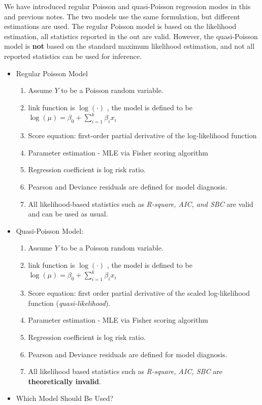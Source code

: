 \documentclass[
]{book}
\providecommand{\tightlist}{%
  \setlength{\itemsep}{0pt}\setlength{\parskip}{0pt}}
\begin{document}
We have introduced regular Poisson and quasi-Poisson regression modes in this and previous notes. The two models use the same formulation, but different estimations are used. The regular Poisson model is based on the likelihood estimation, all statistics reported in the out are valid. However, the quasi-Poisson model is \textbf{not} based on the standard maximum likelihood estimation, and not all reported statistics can be used for inference.

\begin{itemize}
\tightlist
\item
  Regular Poisson Model

  \begin{enumerate}
  \def\labelenumi{\arabic{enumi}.}
  \tightlist
  \item
    Assume \(Y\) to be a Poisson random variable.
  \item
    link function is \(\log(\cdot)\) , the model is defined to be \(\log(\mu) =\beta_0 + \sum_{i=1}^k \beta_ix_i\)
  \item
    Score equation: first-order partial derivative of the log-likelihood function
  \item
    Parameter estimation - MLE via Fisher scoring algorithm
  \item
    Regression coefficient is log risk ratio.
  \item
    Pearson and Deviance residuals are defined for model diagnosis.
  \item
    All likelihood-based statistics such as \emph{R-square, AIC, and SBC} are valid and can be used as usual.
  \end{enumerate}
\item
  Quasi-Poisson Model:

  \begin{enumerate}
  \def\labelenumi{\arabic{enumi}.}
  \tightlist
  \item
    Assume \(Y\) to be a Poisson random variable.
  \item
    link function is \(\log(\cdot)\) , the model is defined to be \(\log(\mu) =\beta_0 + \sum_{i=1}^k \beta_ix_i\)
  \item
    Score equation: first order partial derivative of the scaled log-likelihood function (\emph{quasi-likelihood}).
  \item
    Parameter estimation - MLE via Fisher scoring algorithm
  \item
    Regression coefficient is log risk ratio.
  \item
    Pearson and Deviance residuals are defined for model diagnosis.
  \item
    All likelihood based statistics such as \emph{R-square, AIC, SBC} are \textbf{theoretically invalid}.
  \end{enumerate}
\item
  Which Model Should Be Used?


\end{itemize}
\end{document}
